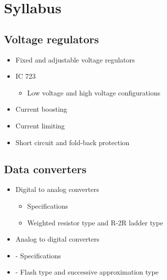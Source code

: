 \documentclass[../course]{subfiles}
\begin{document}
\section{Syllabus}

\subsection{Voltage regulators}

\begin{itemize}
    \item Fixed and adjustable voltage regulators
    \item IC 723

        \begin{itemize}
            \item Low voltage and high voltage configurations
        \end{itemize}

    \item Current boosting
    \item Current limiting
    \item Short circuit and fold-back protection
\end{itemize}

\subsection{Data converters}

\begin{itemize}
    \item Digital to analog converters

        \begin{itemize}
            \item Specifications
            \item Weighted resistor type and R-2R ladder type
        \end{itemize}

    \item Analog to digital converters
    \item- Specifications
    \item- Flash type and successive approximation type
\end{itemize}
\end{document}

